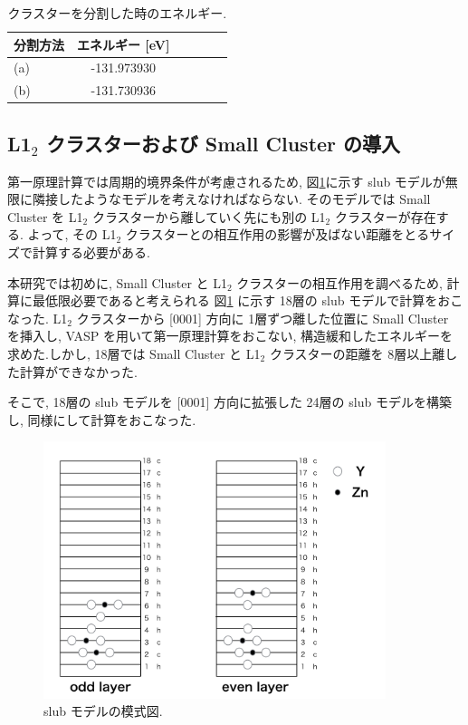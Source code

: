 \begin{table}[htb]
\caption{クラスターを分割した時のエネルギー.}
  \begin{center}
    \begin{tabular}{|l|c|c|c|c|c|} \hline
 分割方法 & エネルギー [eV] \\ \hline
   (a) & -131.973930\\
\hline
   (b) & -131.730936\\
\hline
    \end{tabular}
  \end{center}
\end{table}

\subsection{ L1$_2$ クラスターおよび Small Cluster の導入}

第一原理計算では周期的境界条件が考慮されるため, 図\ref{fig2.3}に示す slub モデルが無限に隣接したようなモデルを考えなければならない. そのモデルでは Small Cluster を L1$_2$ クラスターから離していく先にも別の L1$_2$ クラスターが存在する. よって, その L1$_2$ クラスターとの相互作用の影響が及ばない距離をとるサイズで計算する必要がある. 

本研究では初めに, Small Cluster と L1$_2$ クラスターの相互作用を調べるため, 計算に最低限必要であると考えられる 図\ref{fig2.3} に示す 18層の slub モデルで計算をおこなった. L1$_2$ クラスターから [0001] 方向に 1層ずつ離した位置に Small Cluster を挿入し, VASP を用いて第一原理計算をおこない, 構造緩和したエネルギーを求めた.しかし, 18層では Small Cluster と L1$_2$ クラスターの距離を 8層以上離した計算ができなかった.


そこで, 18層の slub モデルを [0001] 方向に拡張した 24層の slub モデルを構築し, 同様にして計算をおこなった.

\begin{figure}[H]
	\begin{center}
		\includegraphics[width=100mm]{../method/small_cluster_slab18.png}
		\caption{slub モデルの模式図.}
		\label{fig2.3}
	\end{center}
\end{figure}


